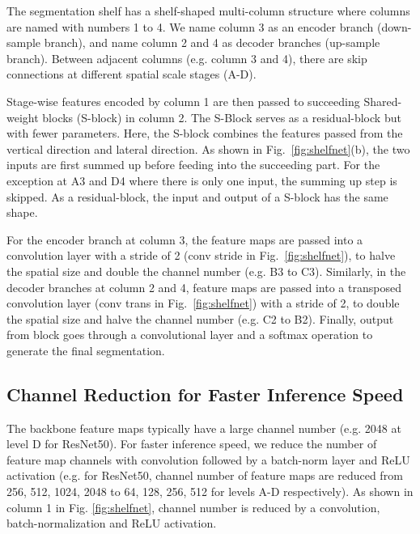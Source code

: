 \documentclass[10pt,twocolumn,letterpaper]{article}
\begin{document}
The segmentation shelf has a shelf-shaped multi-column structure where columns are named with numbers 1 to 4. We name column 3 as an encoder branch (down-sample branch), and name column 2 and 4 as decoder branches (up-sample branch). Between adjacent columns (e.g. column 3 and 4), there are skip connections at different spatial scale stages (A-D). 
  
Stage-wise features encoded by column 1 are then passed to succeeding Shared-weight blocks (S-block) in column 2. The S-Block serves as a residual-block but with fewer parameters. Here, the S-block combines the features passed from the vertical direction and lateral direction. As shown in Fig.~\ref{fig:shelfnet}(b), the two inputs are first summed up before feeding into the succeeding part. For the exception at A3 and D4 where there is only one input, the summing up step is skipped. As a residual-block, the input and output of a S-block has the same shape.
  
For the encoder branch at column 3, the feature maps are passed into a convolution layer with a stride of 2 (conv stride in Fig.~\ref{fig:shelfnet}), to halve the spatial size and double the channel number (e.g. B3 to C3). Similarly, in the decoder branches at column 2 and 4, feature maps are passed into a transposed convolution layer (conv trans in Fig.~\ref{fig:shelfnet}) with a stride of 2, to double the spatial size and halve the channel number (e.g. C2 to B2). Finally, output from block  goes through a  convolutional layer and a softmax operation to generate the final segmentation.

\subsection{Channel Reduction for Faster Inference Speed}
\label{sec:channel_reduction}
The backbone feature maps typically have a large channel number (e.g. 2048 at level D for ResNet50). For faster inference speed, we reduce the number of feature map channels with  convolution followed by a batch-norm layer and ReLU activation (e.g. for ResNet50, channel number of feature maps are reduced from 256, 512, 1024, 2048 to 64, 128, 256, 512 for levels A-D respectively). As shown in column 1 in Fig. \ref{fig:shelfnet}, channel number is reduced by a  convolution, batch-normalization and ReLU activation. 
\end{document}
